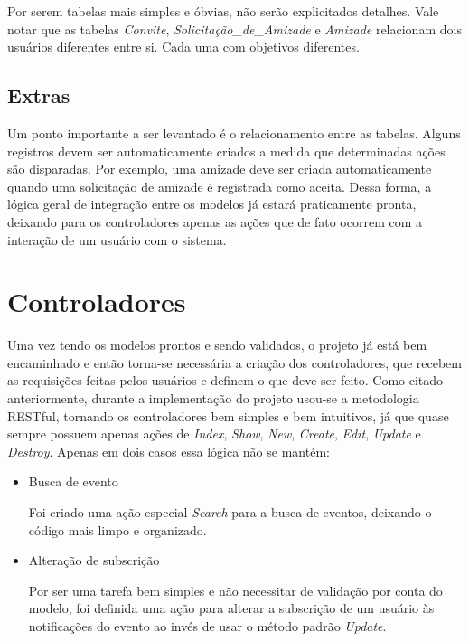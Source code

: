 Por serem tabelas mais simples e óbvias, não serão explicitados detalhes. Vale notar que as tabelas \textit{Convite}, \textit{Solicitação\_de\_Amizade} e \textit{Amizade} relacionam dois usuários diferentes entre si. Cada uma com objetivos diferentes.

\subsection{Extras}

Um ponto importante a ser levantado é o relacionamento entre as tabelas. Alguns registros devem ser automaticamente criados a medida que determinadas ações são disparadas. Por exemplo, uma amizade deve ser criada automaticamente quando uma solicitação de amizade é registrada como aceita. Dessa forma, a lógica geral de integração entre os modelos já estará praticamente pronta, deixando para os controladores apenas as ações que de fato ocorrem com a interação de um usuário com o sistema.

\section{Controladores}

Uma vez tendo os modelos prontos e sendo validados, o projeto já está bem encaminhado e então torna-se necessária a criação dos controladores, que recebem as requisições feitas pelos usuários e definem o que deve ser feito. Como citado anteriormente, durante a implementação do projeto usou-se a metodologia RESTful, tornando os controladores bem simples e bem intuitivos, já que quase sempre possuem apenas ações de \textit{Index}, \textit{Show}, \textit{New}, \textit{Create}, \textit{Edit}, \textit{Update} e \textit{Destroy}. Apenas em dois casos essa lógica não se mantém:

\begin{itemize}
\item Busca de evento

Foi criado uma ação especial \textit{Search} para a busca de eventos, deixando o código mais limpo e organizado.

\item Alteração de subscrição

Por ser uma tarefa bem simples e não necessitar de validação por conta do modelo, foi definida uma ação para alterar a subscrição de um usuário às notificações do evento ao invés de usar o método padrão \textit{Update}.
\end{itemize}

